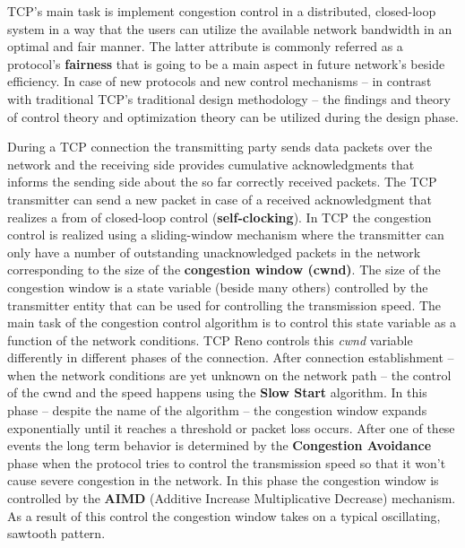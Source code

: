\documentclass[a4paper]{article}
\begin{document}
TCP's main task is implement congestion control in a distributed, closed-loop system in a way that the users can
utilize the available network bandwidth in an optimal and fair manner. The latter attribute is commonly referred as a
protocol's \textbf{fairness} that is going to be a main aspect in future network's beside efficiency. In case of new
protocols and new control mechanisms -- in contrast with traditional TCP's traditional design methodology -- the
findings and theory of control theory and optimization theory can be utilized during the design phase.

During a TCP connection the transmitting party sends data packets over the network and the receiving side provides
cumulative acknowledgments that informs the sending side about the so far correctly received packets. The TCP
transmitter can send a new packet in case of a received acknowledgment that realizes a from of closed-loop control
(\textbf{self-clocking}). In TCP the congestion control is realized using a sliding-window mechanism where the
transmitter can only have a number of outstanding unacknowledged packets in the network corresponding to the size of
the \textbf{congestion window (cwnd)}. The size of the congestion window is a state variable (beside many others)
controlled by the transmitter entity that can be used for controlling the transmission speed. The main task of the
congestion control algorithm is to control this state variable as a function of the network conditions. TCP Reno
controls this \emph{cwnd} variable differently in different phases of the connection. After connection establishment --
when the network conditions are yet unknown on the network path -- the control of the cwnd and the speed happens using
the \textbf{Slow Start} algorithm. In this phase -- despite the name of the algorithm -- the congestion window expands
exponentially until it reaches a threshold or packet loss occurs. After one of these events the long term behavior is
determined by the \textbf{Congestion Avoidance} phase when the protocol tries to control the transmission speed so that
it won't cause severe congestion in the network. In this phase the congestion window is controlled by the \textbf{AIMD}
(Additive Increase Multiplicative Decrease) mechanism. As a result of this control the congestion window takes on a
typical oscillating, sawtooth pattern.
\end{document}
